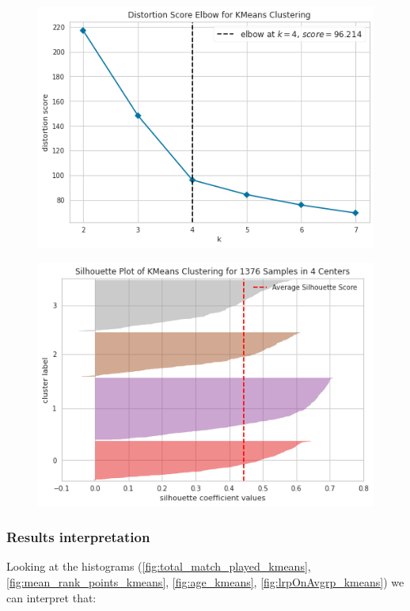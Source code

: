 \documentclass{article}
\begin{document}
\begin{figure}[!h]
\centering
\begin{minipage}{.5\textwidth}
\centering
\includegraphics[width=\textwidth]{kmeans_elbow_rule}
\label{fig:kmeans_elbow_rule}
\end{minipage}%
\begin{minipage}{.5\textwidth}
\centering
\includegraphics[width=\textwidth]{kmeans_silhouette_score}
\label{fig:kmeans_silhouette_score}
\end{minipage}
\end{figure}

\subsubsection{Results interpretation}
Looking at the histograms (\ref{fig:total_match_played_kmeans}, \ref{fig:mean_rank_points_kmeans}, \ref{fig:age_kmeans}, \ref{fig:lrpOnAvgrp_kmeans}) we can interpret that:
\end{document}
